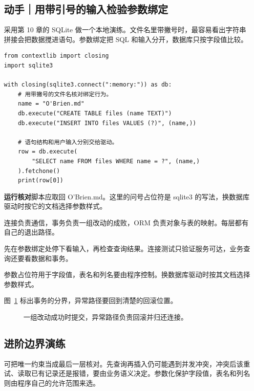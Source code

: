 \subsection*{动手｜用带引号的输入检验参数绑定}

采用第 10 章的 SQLite 做一个本地演练。文件名里带撇号时，最容易看出字符串拼接会把数据搅进语句。参数绑定把 SQL 和输入分开，数据库只按字段值比较。

\begin{lstlisting}[title={\code{bind_query.py}}]
from contextlib import closing
import sqlite3

with closing(sqlite3.connect(":memory:")) as db:
    # 用带撇号的文件名核对绑定行为。
    name = "O'Brien.md"
    db.execute("CREATE TABLE files (name TEXT)")
    db.execute("INSERT INTO files VALUES (?)", (name,))

    # 语句结构和用户输入分别交给驱动。
    row = db.execute(
        "SELECT name FROM files WHERE name = ?", (name,)
    ).fetchone()
    print(row[0])
\end{lstlisting}

\textbf{运行核对}\enspace 脚本应取回 O'Brien.md。这里的问号占位符是 sqlite3 的写法，换数据库驱动时按它的文档选择参数样式。

\begin{myunderstanding}
连接负责通信，事务负责一组改动的成败，ORM 负责对象与表的映射。每层都有自己的退出路径。
\end{myunderstanding}

\begin{pycharmpractice}
先在参数绑定处停下看输入，再检查查询结果。连接测试只验证服务可达，业务查询还要看数据和事务。
\end{pycharmpractice}

\begin{pitfall}
参数占位符用于字段值，表名和列名要由程序控制。换数据库驱动时按其文档选择参数样式。
\end{pitfall}
图~\ref{fig:chapter-14-flow} 标出事务的分界，异常路径要回到清楚的回滚位置。
\begin{figure}[htbp]
  \centering
  \caption{一组改动成功时提交，异常路径负责回滚并归还连接。}
  \label{fig:chapter-14-flow}
\end{figure}

\subsection*{进阶边界演练}
可把唯一约束当成最后一层核对。先查询再插入仍可能遇到并发冲突，冲突后该重试、读取已有记录还是报错，要由业务语义决定。参数化保护字段值，表名和列名则由程序自己的允许范围来选。
